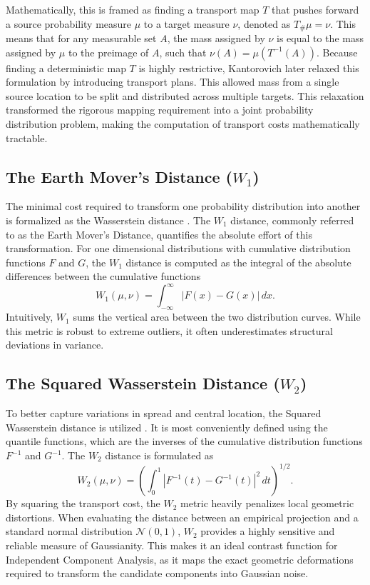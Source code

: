 \documentclass[12pt,a4paper,twoside,openany]{book}
\begin{document}
Mathematically, this is framed as finding a transport map $T$ that pushes forward a source probability measure $\mu$ to a target measure $\nu$, denoted as $T_{\#} \mu = \nu$. 
This means that for any measurable set $A$, the mass assigned by $\nu$ is equal to the mass assigned by $\mu$ to the preimage of $A$, such that $\nu(A) = \mu(T^{-1}(A))$. 
Because finding a deterministic map $T$ is highly restrictive, Kantorovich \citeyear{kantorovich1942} later relaxed this formulation by introducing transport plans. This allowed mass from a single source 
location to be split and distributed across multiple targets. This relaxation transformed the rigorous mapping requirement into a joint probability distribution problem, 
making the computation of transport costs mathematically tractable.

\subsection{The Earth Mover's Distance ($W_1$)}
The minimal cost required to transform one probability distribution into another is formalized as the Wasserstein distance \cite[Chapter 1]{villani2003}. 
The $W_1$ distance, commonly referred to as the Earth Mover's Distance, 
quantifies the absolute effort of this transformation. For one dimensional distributions with cumulative distribution functions $F$ and $G$, the $W_1$ distance is computed as the integral of the 
absolute differences between the cumulative functions
\begin{equation}
    W_1(\mu, \nu) = \int_{-\infty}^\infty |F(x) - G(x)| \, dx.
\end{equation}
Intuitively, $W_1$ sums the vertical area between the two distribution curves. While this metric is robust to extreme outliers, it often underestimates structural deviations in variance.

\subsection{The Squared Wasserstein Distance ($W_2$)}
To better capture variations in spread and central location, the Squared Wasserstein distance is utilized \cite[Chapter 2]{villani2003}. It is most conveniently defined using the quantile functions, 
which are the inverses of the cumulative distribution functions $F^{-1}$ and $G^{-1}$. The $W_2$ distance is formulated as
\begin{equation}
    W_2(\mu, \nu) = \left( \int_0^1 |F^{-1}(t) - G^{-1}(t)|^2 \, dt \right)^{1/2}.
\end{equation}
By squaring the transport cost, the $W_2$ metric heavily penalizes local geometric distortions. When evaluating the distance between an empirical projection and a 
standard normal distribution $\mathcal{N}(0,1)$, $W_2$ provides a highly sensitive and reliable measure of Gaussianity. This makes it an ideal contrast function for Independent Component Analysis, 
as it maps the exact geometric deformations required to transform the candidate components into Gaussian noise.
\end{document}
